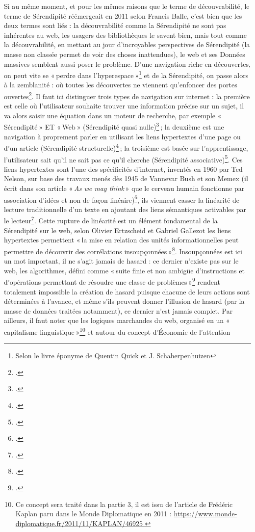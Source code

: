 Si au même moment, et pour les mêmes raisons que le terme de découvrabilité, le terme de Sérendipité réémergeait en 2011 selon Francis Balle, c’est bien que les deux termes sont liés : la découvrabilité comme la Sérendipité ne sont pas inhérentes au web, les usagers des bibliothèques le savent bien, mais tout comme la découvrabilité, en mettant au jour d’incroyables perspectives de Sérendipité (la masse non classée permet de voir des choses inattendues), le web et ses Données massives semblent aussi poser le problème. D’une navigation riche en découvertes, on peut vite se « perdre dans l’hyperespace »\footnote{Selon le livre éponyme de Quentin Quick et J. Schaherpenhuizen} et de la Sérendipité, on passe alors à la zemblanité : où toutes les découvertes ne viennent qu’enfoncer des portes ouvertes\footcite[§ 10]{michel2019}. Il faut ici distinguer trois types de navigation sur internet : la première est celle où l’utilisateur souhaite trouver une information précise sur un sujet, il va alors saisir une équation dans un moteur de recherche, par exemple « Sérendipité » ET « Web » (Sérendipité quasi nulle)\footcite[p. 8]{ertzscheid2003} ; la deuxième est une navigation à proprement parler en utilisant les liens hypertextes d’une page ou d’un article (Sérendipité structurelle)\footcite[p. 8]{ertzscheid2003} ; la troisième est basée sur l’apprentissage, l’utilisateur sait qu’il ne sait pas ce qu’il cherche (Sérendipité associative)\footcite[p. 8]{ertzscheid2003}. Ces liens hypertextes sont l’une des spécificités d’internet, inventés en 1960 par Ted Nelson, sur base des travaux menés dès 1945 de Vannevar Bush et son Memex (il écrit dans son article « \textit{As we may think} » que le cerveau humain fonctionne par association d’idées et non de façon linéaire)\footcite{vanevarbush1945}, ils viennent casser la linéarité de lecture traditionnelle d’un texte en ajoutant des liens sémantiques activables par le lecteur\footcite{14}. Cette rupture de linéarité est un élément fondamental de la Sérendipité sur le web, selon Olivier Ertzscheid et Gabriel Gallezot les liens hypertextes permettent « la mise en relation des unités informationnelles peut permettre de découvrir des corrélations insoupçonnées »\footcite{zotero-221}. Insoupçonnées est ici un mot important, il ne s’agit jamais de hasard : ce dernier n’existe pas sur le web, les algorithmes, défini comme « suite finie et non ambigüe d’instructions et d’opérations permettant de résoudre une classe de problèmes »\footcite{2024a} rendent totalement impossible la création de hasard puisque chacune de leurs actions sont déterminées à l’avance, et même s’ils peuvent donner l’illusion de hasard (par la masse de données traitées notamment), ce dernier n’est jamais complet. Par ailleurs, il faut noter que les logiques marchandes du web, organisé en un « capitalisme linguistique »\footnote{Ce concept sera traité dans la partie 3, il est issu de l'article de Frédéric Kaplan paru dans le Monde Diplomatique en 2011 : \url{https://www.monde-diplomatique.fr/2011/11/KAPLAN/46925 }} et autour du concept d’Économie de l’attention 
